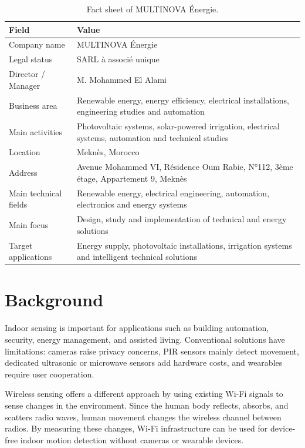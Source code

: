 \documentclass[11pt,a4paper,oneside]{report}
\begin{document}
\begin{table}[H]
\centering
\caption[Fact sheet of MULTINOVA \'Energie]{Fact sheet of MULTINOVA \'Energie.}
\label{tab:multinova-factsheet}
\renewcommand{\arraystretch}{1.25}
\begin{tabularx}{\linewidth}{|>{\raggedright\arraybackslash}p{4.3cm}|X|}
\hline
Field & Value \\
\hline
Company name & MULTINOVA Énergie \\
\hline
Legal status & SARL à associé unique \\
\hline
Director / Manager & M. Mohammed El Alami \\
\hline
Business area & Renewable energy, energy efficiency, electrical installations, engineering studies and automation \\
\hline
Main activities & Photovoltaic systems, solar-powered irrigation, electrical systems, automation and technical studies \\
\hline
Location & Meknès, Morocco \\
\hline
Address & Avenue Mohammed VI, Résidence Oum Rabie, N°112, 3ème étage, Appartement 9, Meknès \\
\hline
Main technical fields & Renewable energy, electrical engineering, automation, electronics and energy systems \\
\hline
Main focus & Design, study and implementation of technical and energy solutions \\
\hline
Target applications & Energy supply, photovoltaic installations, irrigation systems and intelligent technical solutions \\
\hline
\end{tabularx}
\end{table}
\section{Background}

Indoor sensing is important for applications such as building automation, security, energy management, and assisted living. Conventional solutions have limitations: cameras raise privacy concerns, PIR sensors mainly detect movement, dedicated ultrasonic or microwave sensors add hardware costs, and wearables require user cooperation.

Wireless sensing offers a different approach by using existing Wi-Fi signals to sense changes in the environment. Since the human body reflects, absorbs, and scatters radio waves, human movement changes the wireless channel between radios. By measuring these changes, Wi-Fi infrastructure can be used for device-free indoor motion detection without cameras or wearable devices. 
\end{document}
